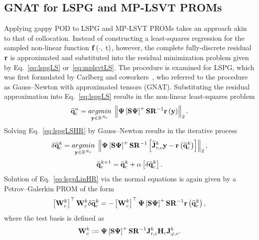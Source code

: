 \subsection{GNAT for LSPG and MP-LSVT PROMs}
%
Applying gappy POD to LSPG and MP-LSVT PROMs takes an approach akin to that of collocation. Instead of constructing a least-squares regression for the sampled non-linear function $\mathbf{f} \left(\cdot, \; \text{t}\right)$, however, the complete fully-discrete residual $\mathbf{r}$ is approximated and substituted into the residual minimization problem given by Eq.~\ref{eq:lspgLS} or~\ref{eq:mplsvtLS}. The procedure is examined for LSPG, which was first formulated by Carlberg and coworkers~\cite{Carlberg2010,Carlberg2013}, who referred to the procedure as Gauss--Newton with approximated tensors (GNAT). Substituting the residual approximation into Eq.~\ref{eq:lspgLS} results in the non-linear least-squares problem
%
\begin{equation}\label{eq:lspgLSHR}
    \consVecCoef^{\timeIdx} = \argmin{\dummyVec \inROne{\numConsModes}} \left\Vert \deimBasis \left[ \sampMat \deimBasis \right]^{+} \sampMat \resScaleInv \resFunc{\dummyVec} \right\Vert_2.
\end{equation}
%
Solving Eq.~\ref{eq:lspgLSHR} by Gauss--Newton results in the iterative process
%
\begin{equation}\label{eq:lsgpLinHR}
    \delta \consVecCoef^{\newtonIdx} = \argmin{\dummyVec \inROne{\numConsModes}} \left\Vert \deimBasis \left[ \sampMat \deimBasis \right]^{+} \sampMat \resScaleInv \left[ \jacobResCoefCons^{\newtonIdx} \dummyVec - \resFunc{\consVecCoef^{\newtonIdx}}\right] \right\Vert_2,
\end{equation}
\begin{equation}
    \mathbf{\widehat{q}}_{c}^{k + 1} = \mathbf{\widehat{q}}_{c}^{k} + \alpha \left[ \delta \mathbf{\widehat{q}}_{c}^{k} \right].
\end{equation}
%
Solution of Eq.~\ref{eq:lsgpLinHR} via the normal equations is again given by a Petrov--Galerkin PROM of the form
%
\begin{equation}\label{eq:lspgHRSolve}
    \left[ \testBasisCons^\newtonIdx \right]^\top \testBasisCons^\newtonIdx \delta \consVecCoef^{\newtonIdx} = -\left[\testBasisCons^\newtonIdx \right]^\top \deimBasis \left[ \sampMat \deimBasis \right]^{+} \sampMat \resScaleInv \resFunc{\consVecCoef^{\newtonIdx}},
\end{equation}
%
where the test basis is defined as
%
\begin{equation}\label{eq:lspgHRTest}
    \testBasisCons^\newtonIdx \defEq \deimBasis \left[ \sampMat \deimBasis \right]^{+} \sampMat \resScaleInv \jacobResCons^{\newtonIdx} \jacobDecodeCons^{\newtonIdx}.
\end{equation}
